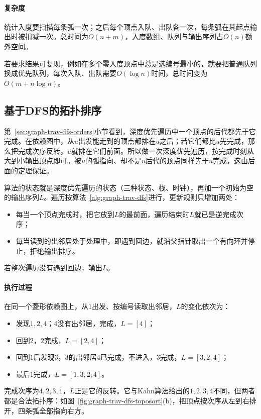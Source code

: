\paragraph{复杂度}
统计入度要扫描每条弧一次；之后每个顶点入队、出队各一次，每条弧在其起点输出时被扣减一次。总时间为$O(n+m)$，入度数组、队列与输出序列占$O(n)$额外空间。

若要求结果可复现，例如在多个零入度顶点中总是选编号最小的，就要把普通队列换成优先队列，每次入队、出队需要$O(\log n)$时间，总时间变为$O(m+n\log n)$。

\subsection{基于DFS的拓扑排序}
\label{sec:graph-trav-dfs-toposort}

第~\ref{sec:graph-trav-dfs-orders}小节看到，深度优先遍历中一个顶点的后代都先于它完成。在依赖图中，从$u$出发能走到的顶点都排在$u$之后；若它们都比$u$先完成，那么把完成次序反转，$u$就排在它们前面。所以做一次深度优先遍历，按完成时刻从大到小输出顶点即可。被$u$的弧指向、却不是$u$后代的顶点同样先于$u$完成，这由后面的定理保证。

算法的状态就是深度优先遍历的状态（三种状态、栈、时钟），再加一个初始为空的输出序列$L$。遍历按算法~\ref{alg:graph-trav-dfs}进行，更新规则只增加两处：
\begin{itemize}
  \item 每当一个顶点完成时，把它放到$L$的最前面，遍历结束时$L$就已是逆完成次序；
  \item 每当读到的出邻居处于处理中，即遇到回边，就沿父指针取出一个有向环并停止，拒绝输出排序。
\end{itemize}
若整次遍历没有遇到回边，输出$L$。

\paragraph{执行过程}
在同一个菱形依赖图上，从$1$出发、按编号读取出邻居，$L$的变化依次为：
\begin{itemize}
  \item 发现$1,2,4$；$4$没有出邻居，完成，$L=[4]$；
  \item 回到$2$，$2$完成，$L=[2,4]$；
  \item 回到$1$后发现$3$，$3$的出邻居$4$已完成，不进入，$3$完成，$L=[3,2,4]$；
  \item 最后$1$完成，$L=[1,3,2,4]$。
\end{itemize}
完成次序为$4,2,3,1$，$L$正是它的反转。它与Kahn算法给出的$1,2,3,4$不同，但两者都是合法拓扑序：如图~\ref{fig:graph-trav-dfs-toposort}(b)，把顶点按次序从左到右排开，四条弧全部指向右方。

